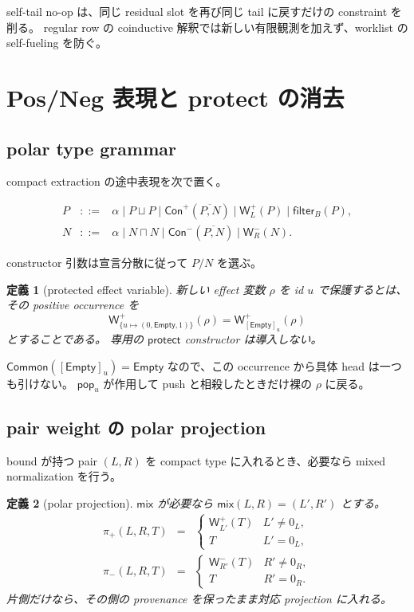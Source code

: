 \documentclass[uplatex,dvipdfmx,a4paper,10.5pt]{jsarticle}
\theoremstyle{jpplain}
\newtheorem{definition}{定義}[section]
\newcommand{\Empty}{\mathsf{Empty}}
\newcommand{\Common}{\mathsf{Common}}
\newcommand{\mix}{\mathsf{mix}}
\newcommand{\projp}{\pi_{+}}
\newcommand{\projn}{\pi_{-}}
\newcommand{\Filter}[2]{\mathsf{filter}_{#1}(#2)}
\newcommand{\PWeight}[2]{\mathsf{W}^{+}_{#1}(#2)}
\newcommand{\NWeight}[2]{\mathsf{W}^{-}_{#1}(#2)}
\newcommand{\takeop}[2]{[#1]_{#2}}
\newcommand{\popop}[1]{\mathsf{pop}_{#1}}
\newcommand{\kw}[1]{\mathsf{#1}}
\begin{document}
self-tail no-op は、同じ residual slot を再び同じ tail に戻すだけの constraint を削る。
regular row の coinductive 解釈では新しい有限観測を加えず、worklist の self-fueling を防ぐ。

\section{Pos/Neg 表現と protect の消去}

\subsection{polar type grammar}

compact extraction の途中表現を次で置く。

\[
\begin{array}{rcl}
P &::=& \alpha \mid P\sqcup P \mid \kw{Con}^{+}(\overline{P,N})
       \mid \PWeight{L}{P} \mid \Filter{B}{P},\\
N &::=& \alpha \mid N\sqcap N \mid \kw{Con}^{-}(\overline{P,N})
       \mid \NWeight{R}{N}.
\end{array}
\]

constructor 引数は宣言分散に従って $P/N$ を選ぶ。

\begin{definition}[protected effect variable]
新しい effect 変数 $\rho$ を id $u$ で保護するとは、その positive occurrence を
\[
  \PWeight{\{u\mapsto(0,\Empty,1)\}}{\rho}
  =\PWeight{\takeop{\Empty}{u}}{\rho}
\]
とすることである。
専用の $\mathsf{protect}$ constructor は導入しない。
\end{definition}

$\Common(\takeop{\Empty}{u})=\Empty$ なので、この occurrence から具体 head は一つも引けない。
$\popop{u}$ が作用して push と相殺したときだけ裸の $\rho$ に戻る。

\subsection{pair weight の polar projection}

bound が持つ pair $(L,R)$ を compact type に入れるとき、必要なら mixed normalization を行う。

\begin{definition}[polar projection]
$\mix$ が必要なら $\mix(L,R)=(L',R')$ とする。
\[
\begin{array}{rcl}
\projp(L,R,T)&=&\begin{cases}
\PWeight{L'}{T}&L'\neq0_L,\\T&L'=0_L,
\end{cases}\\[1ex]
\projn(L,R,T)&=&\begin{cases}
\NWeight{R'}{T}&R'\neq0_R,\\T&R'=0_R.
\end{cases}
\end{array}
\]
片側だけなら、その側の provenance を保ったまま対応 projection に入れる。
\end{definition}
\end{document}
